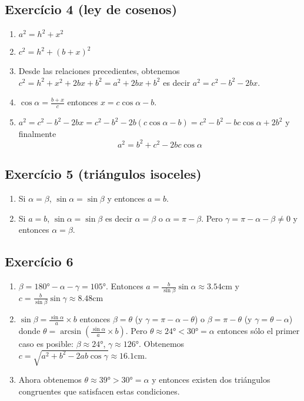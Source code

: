 \subsection{Exercício 4 (ley de cosenos)}

\begin{enumerate}
\item $a^2 = h^2 + x^2$
\item $c^2 = h^2 + \left(b+x\right)^2$
\item Desde las relaciones precedientes, obtenemos
  $c^2 = h^2 + x^2 + {2bx} + b^2 = a^2 + {2bx} + b^2$ es decir
  $a^2 = c^2 - b^2 - {2bx}$.
\item $\cos \alpha = \frac{b+x}{c}$ entonces
  $x = {c \cos \alpha} - b$.
\item $a^2 = c^2 - b^2 - {2bx} =
  c^2 - b^2 - {2b \left( {c \cos \alpha} - b \right)} =
  c^2 - b^2 - {bc\cos \alpha} + 2b^2$ y finalmente
  $$a^2 = b^2 + c^2 - {2bc \cos\alpha}$$
\end{enumerate}

\subsection{Exercício 5 (triángulos isoceles)}

\begin{enumerate}
  \item Si $\alpha=\beta$, $\sin \alpha = \sin \beta$ y
    entonces $a=b$.
  \item Si $a=b$, $\sin \alpha = \sin \beta$ es decir
    $\alpha = \beta$ o $\alpha = \pi - \beta$.
    Pero $\gamma = \pi - \alpha - \beta \neq 0$ y entonces $\alpha = \beta$.
\end{enumerate}

\subsection{Exercício 6}

\begin{enumerate}
\item $\beta = 180° - \alpha - \gamma = 105°$. Entonces
$a = \frac{b}{\sin \beta} \sin \alpha \approx
3.54 \text{cm}$ y
$c = \frac{b}{\sin \beta} \sin \gamma \approx 8.48 \text{cm}$

\item $\sin \beta = \frac{\sin \alpha}{a} \times b$
  entonces $\beta = \theta$ (y $\gamma = \pi - \alpha - \theta$) o
  $\beta = \pi - \theta$ (y $\gamma = \theta - \alpha$) donde
  $\theta = \arcsin \left(\frac{\sin \alpha}{a} \times b\right)$.
  Pero $\theta \approx 24° < 30° = \alpha$ entonces sólo el primer caso
  es posible: $\beta \approx 24°$, $\gamma \approx 126°$.
  Obtenemos
    $c = \sqrt{a^2 + b^2 - {2ab \cos \gamma}} \approx 16.1\text{cm}$.

\item Ahora obtenemos $\theta \approx 39° > 30° = \alpha$ y entonces
  existen dos triángulos congruentes que satisfacen estas condiciones.

\end{enumerate}

